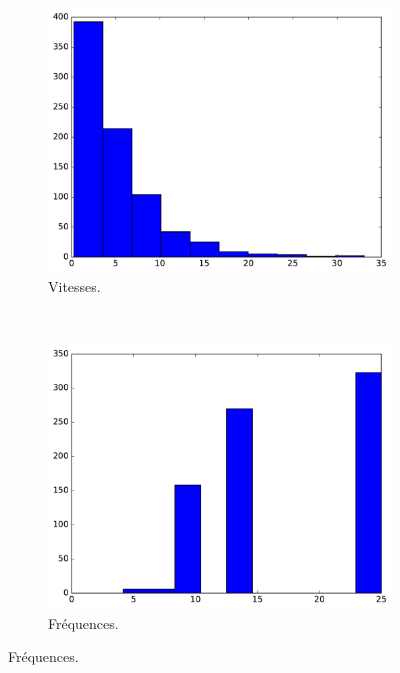 	\newcommand{\subImgWclicks}{0.32\textwidth}
	
	\begin{figure}[!htbp]
		\begin{subfigure}[t]{\subImgWclicks}
			\centering
			\includegraphics[width=\textwidth]{figures/ch3/atom_filteredSpeed}
			\caption{Vitesses.}
			\label{fig:atom_filteredSpeed}
		\end{subfigure}
		~
		\begin{subfigure}[t]{\subImgWclicks}
			\centering
			\includegraphics[width=\textwidth]{figures/ch3/atom_frequency}
			\caption{Fréquences.}
			\label{fig:atom_frequency}
		\end{subfigure}

\end{figure}
